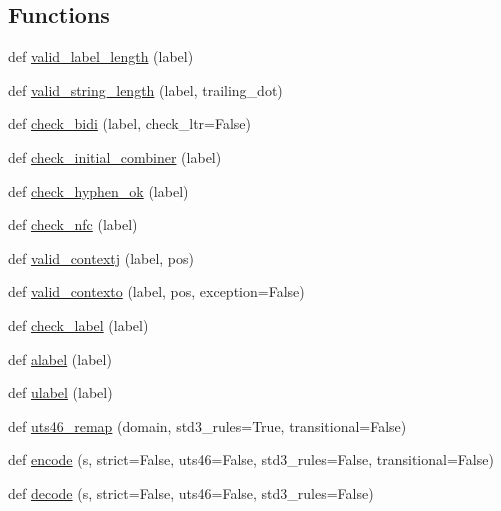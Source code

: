 \subsection*{Functions}
\begin{DoxyCompactItemize}
\item 
def \hyperlink{namespacepip_1_1__vendor_1_1idna_1_1core_acd48dccb4945430b28b3d5ad28d05545}{valid\+\_\+label\+\_\+length} (label)
\item 
def \hyperlink{namespacepip_1_1__vendor_1_1idna_1_1core_a46abadd9be760400a42c0afc32d93e41}{valid\+\_\+string\+\_\+length} (label, trailing\+\_\+dot)
\item 
def \hyperlink{namespacepip_1_1__vendor_1_1idna_1_1core_a32a613317ceb9eb4cd52fdd73b3f1248}{check\+\_\+bidi} (label, check\+\_\+ltr=False)
\item 
def \hyperlink{namespacepip_1_1__vendor_1_1idna_1_1core_a585b0e816f47c888b2bee45b8558e8fe}{check\+\_\+initial\+\_\+combiner} (label)
\item 
def \hyperlink{namespacepip_1_1__vendor_1_1idna_1_1core_a81c0586c1db1facb045d6ec94210fde0}{check\+\_\+hyphen\+\_\+ok} (label)
\item 
def \hyperlink{namespacepip_1_1__vendor_1_1idna_1_1core_ae9c33c8013e65ab232c798b879f7b5b7}{check\+\_\+nfc} (label)
\item 
def \hyperlink{namespacepip_1_1__vendor_1_1idna_1_1core_ae0ccbd5b53689c3986cd22100cbc8e99}{valid\+\_\+contextj} (label, pos)
\item 
def \hyperlink{namespacepip_1_1__vendor_1_1idna_1_1core_a741f7cca90b4a6adc176a40ff242ec10}{valid\+\_\+contexto} (label, pos, exception=False)
\item 
def \hyperlink{namespacepip_1_1__vendor_1_1idna_1_1core_ae9fc88587359b163ac595d519715c099}{check\+\_\+label} (label)
\item 
def \hyperlink{namespacepip_1_1__vendor_1_1idna_1_1core_a59626ddc5d21ec43787eba30bdf1b2bd}{alabel} (label)
\item 
def \hyperlink{namespacepip_1_1__vendor_1_1idna_1_1core_aa5d8b1ef65c7126d2fbd3b671b105ad2}{ulabel} (label)
\item 
def \hyperlink{namespacepip_1_1__vendor_1_1idna_1_1core_a2d90033244fa673825a46b11909a635d}{uts46\+\_\+remap} (domain, std3\+\_\+rules=True, transitional=False)
\item 
def \hyperlink{namespacepip_1_1__vendor_1_1idna_1_1core_ab44c2946ca8d572559f40521032afe1a}{encode} (s, strict=False, uts46=False, std3\+\_\+rules=False, transitional=False)
\item 
def \hyperlink{namespacepip_1_1__vendor_1_1idna_1_1core_ab8a24800679a07c3161db86a9b0a73e6}{decode} (s, strict=False, uts46=False, std3\+\_\+rules=False)
\end{DoxyCompactItemize}


